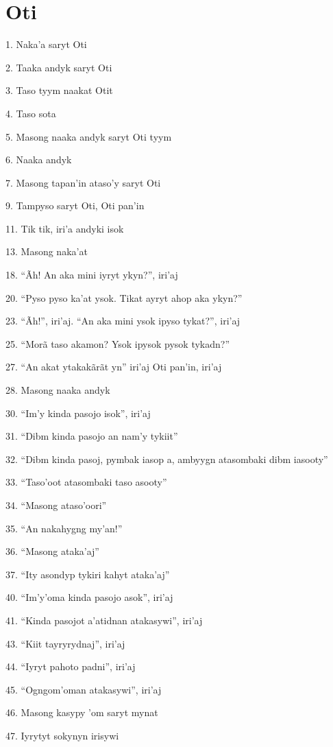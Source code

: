 \section{Oti}

1. Naka'a saryt Oti

2. Taaka andyk saryt Oti

3. Taso tyym naakat Otit

4. Taso sota

5. Masong naaka andyk saryt Oti tyym

6. Naaka andyk

7. Masong tapan'in ataso'y saryt Oti %

9. Tampyso saryt Oti, Oti pan'in

11. Tik tik, iri'a andyki isok

13. Masong naka'at

18. ``Ãh! An aka mini iyryt ykyn?'', iri'aj

20. ``Pyso pyso ka'at ysok. Tikat ayryt ahop aka ykyn?''

23. ``Ãh!'', iri'aj. ``An aka mini ysok ipyso tykat?'', iri'aj

25. ``Morã taso akamon? Ysok ipysok pysok tykadn?''

27. ``An akat ytakakãrãt yn'' iri'aj Oti pan'in, iri'aj

28. Masong naaka andyk

30. ``Im'y kinda pasojo isok'', iri'aj

31. ``Dibm kinda pasojo an nam'y tykiit''

32. ``Dibm kinda pasoj, pymbak iasop a, ambyygn atasombaki dibm iasooty''

33. ``Taso'oot atasombaki taso asooty''

34. ``Masong ataso'oori''

35. ``An nakahygng my'an!''

36. ``Masong ataka'aj''

37. ``Ity asondyp tykiri kahyt ataka'aj''

40. ``Im'y'oma kinda pasojo asok'', iri'aj

41. ``Kinda pasojot a'atidnan atakasywi'', iri'aj

43. ``Kiit tayryrydnaj'', iri'aj

44. ``Iyryt pahoto padni'', iri'aj

45. ``Ogngom'oman atakasywi'', iri'aj

46. Masong kasypy 'om saryt mynat

47. Iyrytyt sokynyn irisywi

